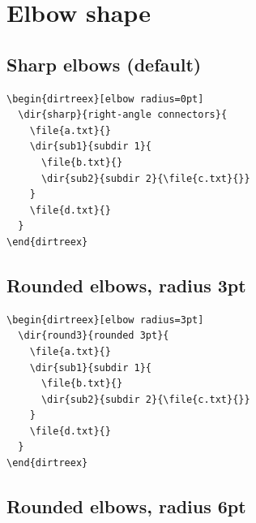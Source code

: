 \documentclass[11pt]{article}
\begin{document}
\clearpage

\section{Elbow shape}

\subsection{Sharp elbows (default)}

\begin{Verbatim}
\begin{dirtreex}[elbow radius=0pt]
  \dir{sharp}{right-angle connectors}{
    \file{a.txt}{}
    \dir{sub1}{subdir 1}{
      \file{b.txt}{}
      \dir{sub2}{subdir 2}{\file{c.txt}{}}
    }
    \file{d.txt}{}
  }
\end{dirtreex}
\end{Verbatim}

\begin{dirtreex}[elbow radius=0pt]
\end{dirtreex}

\subsection{Rounded elbows, radius 3pt}

\begin{Verbatim}
\begin{dirtreex}[elbow radius=3pt]
  \dir{round3}{rounded 3pt}{
    \file{a.txt}{}
    \dir{sub1}{subdir 1}{
      \file{b.txt}{}
      \dir{sub2}{subdir 2}{\file{c.txt}{}}
    }
    \file{d.txt}{}
  }
\end{dirtreex}
\end{Verbatim}

\begin{dirtreex}[elbow radius=3pt]
\end{dirtreex}

\subsection{Rounded elbows, radius 6pt}
\end{document}

